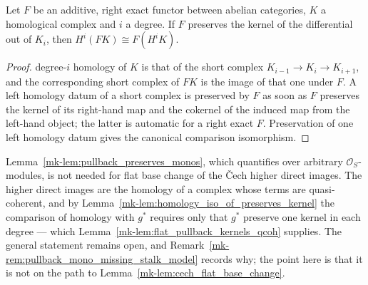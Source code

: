 \begin{lemma}\label{mk-lem:homology_iso_of_preserves_kernel}
  \leanok

  Let \(F\) be an additive, right exact functor between abelian categories, \(K\) a homological
  complex and \(i\) a degree. If \(F\) preserves the kernel of the differential out of \(K_i\),
  then \(H^i(F K) \cong F(H^i K)\).
\end{lemma}

\begin{proof}
  \leanokThe degree-\(i\) homology of \(K\) is that of the short complex
  \(K_{i-1} \to K_i \to K_{i+1}\), and the corresponding short complex of \(F K\) is the image of
  that one under \(F\). A left homology datum of a short complex is preserved by \(F\) as soon as
  \(F\) preserves the kernel of its right-hand map and the cokernel of the induced map from the
  left-hand object; the latter is automatic for a right exact \(F\). Preservation of one left
  homology datum gives the canonical comparison isomorphism.
\end{proof}

\begin{remark}
  \label{mk-rem:flat_exactness_qcoh_suffices}
  Lemma~\ref{mk-lem:pullback_preserves_monos}, which quantifies over arbitrary
  \(\mathcal{O}_S\)-modules, is not needed for flat base change of the \v{C}ech higher direct
  images. The higher direct images are the homology of a complex whose terms are quasi-coherent,
  and by Lemma~\ref{mk-lem:homology_iso_of_preserves_kernel} the comparison of homology with \(g^*\)
  requires only that \(g^*\) preserve one kernel in each degree --- which
  Lemma~\ref{mk-lem:flat_pullback_kernels_qcoh} supplies. The general statement remains open, and
  Remark~\ref{mk-rem:pullback_mono_missing_stalk_model} records why; the point here is that it is not
  on the path to Lemma~\ref{mk-lem:cech_flat_base_change}.
\end{remark}

